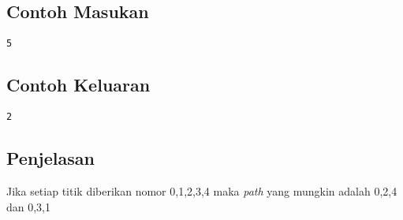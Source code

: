 \documentclass{article}
\begin{document}
\begin{multicols}{2}
\subsection*{Contoh Masukan}
\begin{lstlisting}
5
\end{lstlisting}
\columnbreak
\subsection*{Contoh Keluaran}
\begin{lstlisting}
2
\end{lstlisting}
\vfill
\null
\end{multicols}

\subsection*{Penjelasan}
Jika setiap titik diberikan nomor 0,1,2,3,4 maka \textit{path} yang mungkin adalah 0,2,4 dan 0,3,1

\pagebreak
\end{document}
